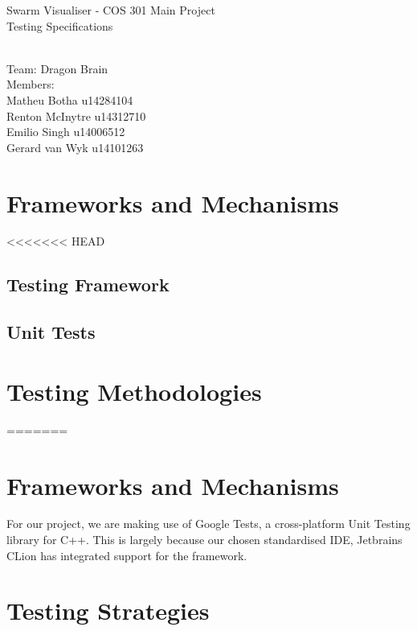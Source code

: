 \documentclass[11pt]{article}
\begin{document}
\begin{titlepage}

\begin{center}
\begin{huge}
Swarm Visualiser - COS 301 Main Project
\\
Testing Specifications
\begin{small}
\\
Team: Dragon Brain
\\
Members:
\\
Matheu Botha u14284104
\\
Renton McInytre u14312710
\\
Emilio Singh u14006512
\\
Gerard van Wyk u14101263

\end{small}

\end{huge}
\end{center}
\end{titlepage}

\pagebreak

\tableofcontents

\section{Frameworks and Mechanisms}
<<<<<<< HEAD
\subsection{Testing Framework}
\lipsum
\subsection{Unit Tests}
\lipsum
\section{Testing Methodologies}
=======
\section{Frameworks and Mechanisms}
For our project, we are making use of Google Tests, a cross-platform Unit Testing library for C++. This is largely because our chosen standardised IDE, Jetbrains CLion has integrated support for the framework.

\section{Testing Strategies}
\end{document}
